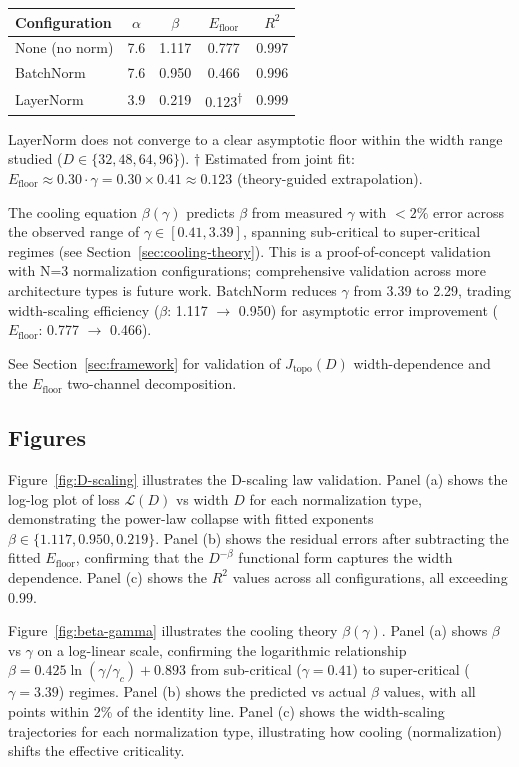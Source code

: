 \documentclass[11pt, a4paper]{article}
\theoremstyle{plain}
\begin{document}
\begin{center}
\begin{tabular}{lcccc}
\toprule
Configuration & $\alpha$ & $\beta$ & $E_{\mathrm{floor}}$ & $R^2$ \\
\midrule
None (no norm) & 7.6 & 1.117 & 0.777 & 0.997 \\
BatchNorm & 7.6 & 0.950 & 0.466 & 0.996 \\
LayerNorm & 3.9 & 0.219 & 0.123\textsuperscript{$\dagger$} & 0.999 \\
\bottomrule
\end{tabular}
\end{center}
{\small * LayerNorm does not converge to a clear asymptotic floor within the width range studied ($D \in \{32,48,64,96\}$). $\dagger$ Estimated from joint fit: $E_{\mathrm{floor}} \approx 0.30 \cdot \gamma = 0.30 \times 0.41 \approx 0.123$ (theory-guided extrapolation).}

The cooling equation $\beta(\gamma)$ predicts $\beta$ from measured $\gamma$ with $<2\%$ error across the observed range of $\gamma \in [0.41, 3.39]$, spanning sub-critical to super-critical regimes (see Section~\ref{sec:cooling-theory}). This is a proof-of-concept validation with N=3 normalization configurations; comprehensive validation across more architecture types is future work. BatchNorm reduces $\gamma$ from 3.39 to 2.29, trading width-scaling efficiency ($\beta$: 1.117 $\to$ 0.950) for asymptotic error improvement ($E_{\mathrm{floor}}$: 0.777 $\to$ 0.466).

\medskip
See Section~\ref{sec:framework} for validation of $J_{\mathrm{topo}}(D)$ width-dependence and the $E_{\mathrm{floor}}$ two-channel decomposition.

\subsection{Figures}

Figure~\ref{fig:D-scaling} illustrates the D-scaling law validation. Panel (a) shows the log-log plot of loss $\mathcal{L}(D)$ vs width $D$ for each normalization type, demonstrating the power-law collapse with fitted exponents $\beta \in \{1.117, 0.950, 0.219\}$. Panel (b) shows the residual errors after subtracting the fitted $E_{\mathrm{floor}}$, confirming that the $D^{-\beta}$ functional form captures the width dependence. Panel (c) shows the $R^2$ values across all configurations, all exceeding $0.99$.

Figure~\ref{fig:beta-gamma} illustrates the cooling theory $\beta(\gamma)$. Panel (a) shows $\beta$ vs $\gamma$ on a log-linear scale, confirming the logarithmic relationship $\beta = 0.425 \ln(\gamma/\gamma_c) + 0.893$ from sub-critical ($\gamma=0.41$) to super-critical ($\gamma=3.39$) regimes. Panel (b) shows the predicted vs actual $\beta$ values, with all points within 2\% of the identity line. Panel (c) shows the width-scaling trajectories for each normalization type, illustrating how cooling (normalization) shifts the effective criticality.
\end{document}
